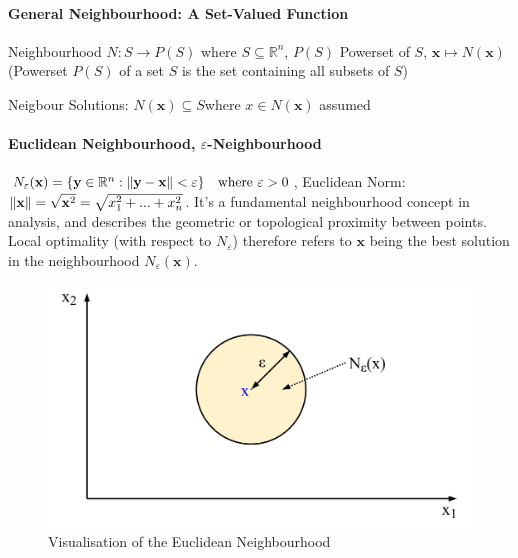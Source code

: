 \documentclass[11pt]{article}
\DeclarePairedDelimiter\norm{\lVert}{\rVert}
\begin{document}
\paragraph{General Neighbourhood: A Set-Valued Function} Neighbourhood $N: S \rightarrow P(S)$ where $S\subseteq \mathbb{R}^n$, $P(S)$ Powerset of $S$, $\textbf{x} \mapsto N(\textbf{x})$ (Powerset $P(S)$ of a set $S$ is the set containing all subsets of $S$)

Neigbour Solutions: $N(\textbf{x}) \subseteq S$\quad where $x\in N(\textbf{x})$ assumed

\paragraph{Euclidean Neighbourhood, $\varepsilon$-Neighbourhood} $N_\varepsilon (\textbf{x})=\{\textbf{y}\in\mathbb{R}^n:\norm{\textbf{y}-\textbf{x}}<\varepsilon\} \quad \text{where }\varepsilon>0$, Euclidean Norm: $\norm{\textbf{x}} = \sqrt{\textbf{x}^2} = \sqrt{x_1^2+...+x_n^2}$. It's a fundamental neighbourhood concept in analysis, and describes the geometric or topological proximity between points. Local optimality (with respect to $N_\varepsilon$) therefore refers to $\textbf{x}$ being the best solution in the neighbourhood $N_\varepsilon(\textbf{x})$.

\begin{figure}[tbh]
	\centering
	\includegraphics[width=0.6\linewidth,keepaspectratio]{euclidean_neighbourhood}
	\caption{Visualisation of the Euclidean Neighbourhood}
	\label{fig:euclideanneighbourhood}
\end{figure}
\end{document}
